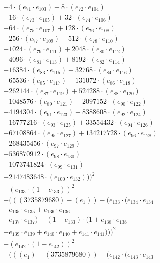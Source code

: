 \documentclass[10pt, a4paper]{article}
\begin{document}
\begin{align*}
& + 4 \cdot (e_{71} \cdot e_{103}) + 8 \cdot (e_{72} \cdot e_{104}) \\
& + 16 \cdot (e_{73} \cdot e_{105}) + 32 \cdot (e_{74} \cdot e_{106}) \\
& + 64 \cdot (e_{75} \cdot e_{107}) + 128 \cdot (e_{76} \cdot e_{108}) \\
& + 256 \cdot (e_{77} \cdot e_{109}) + 512 \cdot (e_{78} \cdot e_{110}) \\
& + 1024 \cdot (e_{79} \cdot e_{111}) + 2048 \cdot (e_{80} \cdot e_{112}) \\
& + 4096 \cdot (e_{81} \cdot e_{113}) + 8192 \cdot (e_{82} \cdot e_{114}) \\
& + 16384 \cdot (e_{83} \cdot e_{115}) + 32768 \cdot (e_{84} \cdot e_{116}) \\
& + 65536 \cdot (e_{85} \cdot e_{117}) + 131072 \cdot (e_{86} \cdot e_{118}) \\
& + 262144 \cdot (e_{87} \cdot e_{119}) + 524288 \cdot (e_{88} \cdot e_{120}) \\
& + 1048576 \cdot (e_{89} \cdot e_{121}) + 2097152 \cdot (e_{90} \cdot e_{122}) \\
& + 4194304 \cdot (e_{91} \cdot e_{123}) + 8388608 \cdot (e_{92} \cdot e_{124}) \\
& + 16777216 \cdot (e_{93} \cdot e_{125}) + 33554432 \cdot (e_{94} \cdot e_{126}) \\
& + 67108864 \cdot (e_{95} \cdot e_{127}) + 134217728 \cdot (e_{96} \cdot e_{128}) \\
& + 268435456 \cdot (e_{97} \cdot e_{129}) \\
& + 536870912 \cdot (e_{98} \cdot e_{130}) \\
& + 1073741824 \cdot (e_{99} \cdot e_{131}) \\
& + 2147483648 \cdot (e_{100} \cdot e_{132})))^{2} \\
& + (e_{133} \cdot (1 - e_{133}))^{2} \\
& + (((3735879680) - (e_{1})) - (e_{133} \cdot (e_{134} \cdot e_{134} \\
& + e_{135} \cdot e_{135} + e_{136} \cdot e_{136} \\
& + e_{137} \cdot e_{137}) - (1 - e_{133}) \cdot (1 + e_{138} \cdot e_{138} \\
& + e_{139} \cdot e_{139} + e_{140} \cdot e_{140} + e_{141} \cdot e_{141})))^{2} \\
& + (e_{142} \cdot (1 - e_{142}))^{2} \\
& + (((e_{1}) - (3735879680)) - (e_{142} \cdot (e_{143} \cdot e_{143} \\

\end{align*}
\end{document}
